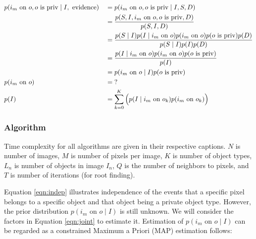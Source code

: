 \documentclass[11pt]{article}
\begin{document}
\begin{align}
    & p(i_m \textrm{ on } o, o \textrm{ is priv} \mid I, \textrm{ evidence})     && = p(i_m \textrm{ on } o, o \textrm{ is priv} \mid I, S, D) \notag\\
    & \quad && = \frac
        {p(S, I, i_m \textrm{ on } o, o \textrm{ is priv}, D)}
        {p(S, I, D)} \notag\\
    & \quad && = \frac
        {p(S \mid I) p(I \mid i_m \textrm{ on } o) p(i_m \textrm{ on } o) p(o \textrm{ is priv}) p(D)}
        {p(S \mid I) p(I) p(D)} \notag\\
    & \quad && = \frac
        {p(I \mid i_m \textrm{ on } o) p(i_m \textrm{ on } o) p(o \textrm{ is priv})}
        {p(I)} \label{eqn:joint}\\
    & \quad && = p(i_m \textrm{ on } o \mid I) p(o \textrm{ is priv}) \label{eqn:indep}\\
    & p(i_m \textrm{ on } o) 
        && = \textrm{?}\\
    & p(I)
        && = \sum_{k = 0}^{K} \Big( p(I \mid i_m \textrm{ on } o_k) p(i_m \textrm{ on } o_k) \Big)%
\end{align}%

\subsubsection{Algorithm}\label{sec:t1alg}

Time complexity for all algorithms are given in their respective captions.  $N$ is number of images, $M$ is number of pixels per image, $K$ is number of object types, $L_n$ is number of objects in image $I_n$, $Q$ is the number of neighbors to pixels, and $T$ is number of iterations (for root finding). 

Equation \ref{eqn:indep} illustrates independence of the events that a specific pixel belongs to a specific object and that object being a private object type.  However, the prior distribution $p(i_m \textrm{ on } o \mid I)$ is still unknown.  We will consider the factors in Equation \ref{eqn:joint} to estimate it.  Estimation of $p(i_m \textrm{ on } o \mid I)$ can be regarded as a constrained Maximum a Priori (MAP) estimation follows:
\end{document}

